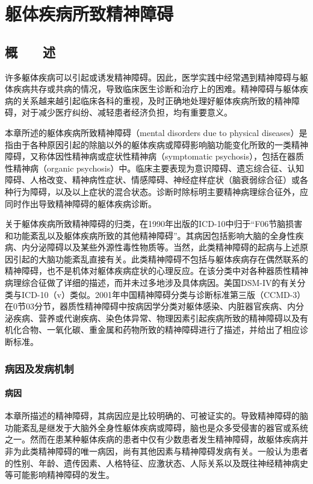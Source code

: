 \chapter{躯体疾病所致精神障碍}

\section{概　　述}

许多躯体疾病可以引起或诱发精神障碍。因此，医学实践中经常遇到精神障碍与躯体疾病共存或共病的情况，导致临床医生诊断和治疗上的困难。精神障碍与躯体疾病的关系越来越引起临床各科的重视，及时正确地处理好躯体疾病所致的精神障碍，对于减少医疗纠纷、减轻患者经济负担，均有重要意义。

本章所述的躯体疾病所致精神障碍（mental disorders due to physical
diseases）是指由于各种原因引起的除脑以外的躯体疾病或障碍影响脑功能变化所致的一类精神障碍，又称体因性精神病或症状性精神病（symptomatic
psychosis），包括在器质性精神病（organic
psychosis）中。临床主要表现为意识障碍、遗忘综合征、认知障碍、人格改变、精神病性症状、情感障碍、神经症样症状（脑衰弱综合征）或各种行为障碍，以及以上症状的混合状态。诊断时除标明主要精神病理综合征外，应同时作出导致精神障碍的躯体疾病诊断。

关于躯体疾病所致精神障碍的归类，在1990年出版的ICD-10中归于``F06节脑损害和功能紊乱以及躯体疾病所致的其他精神障碍''。其病因包括影响大脑的全身性疾病、内分泌障碍以及某些外源性毒性物质等。当然，此类精神障碍的起病与上述原因引起的大脑功能紊乱直接有关。此类精神障碍不包括与躯体疾病存在偶然联系的精神障碍，也不是机体对躯体疾病症状的心理反应。在该分类中对各种器质性精神病理综合征做了详细的描述，而并未过多地涉及具体病因。美国DSM-IV的有关分类与ICD-10（v）类似。2001年中国精神障碍分类与诊断标准第三版（CCMD-3）在0节03分节，器质性精神障碍中按病因学分类对躯体感染、内脏器官疾病、内分泌疾病、营养或代谢疾病、染色体异常、物理因素引起疾病所致的精神障碍以及有机化合物、一氧化碳、重金属和药物所致的精神障碍进行了描述，并给出了相应诊断标准。

\subsection{病因及发病机制}

\subsubsection{病因}

本章所描述的精神障碍，其病因应是比较明确的、可被证实的。导致精神障碍的脑功能紊乱是继发于大脑外全身性躯体疾病或障碍，脑也是众多受侵害的器官或系统之一。然而在患某种躯体疾病的患者中仅有少数患者发生精神障碍，故躯体疾病并非为此类精神障碍的唯一病因，尚有其他因素与精神障碍发病有关。一般认为患者的性别、年龄、遗传因素、人格特征、应激状态、人际关系以及既往神经精神病史等可能影响精神障碍的发生。

